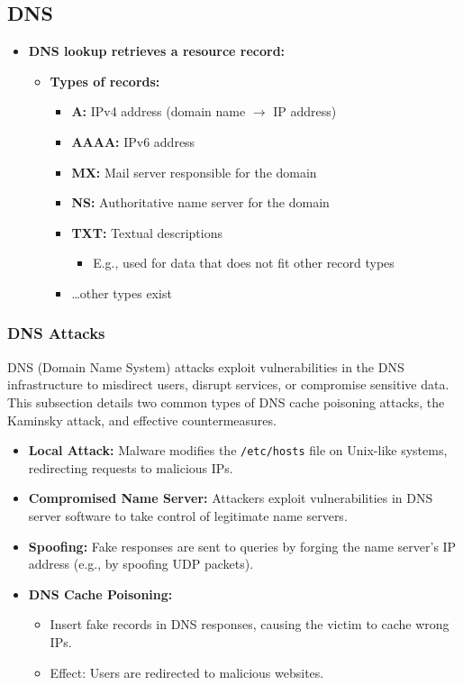 \subsection{DNS}
\begin{itemize}
    \item \textbf{DNS lookup retrieves a resource record:}
    \begin{itemize}
        \item \textbf{Types of records:}
        \begin{itemize}
            \item \textbf{A:} IPv4 address (domain name $\rightarrow$ IP address)
            \item \textbf{AAAA:} IPv6 address
            \item \textbf{MX:} Mail server responsible for the domain
            \item \textbf{NS:} Authoritative name server for the domain
            \item \textbf{TXT:} Textual descriptions
            \begin{itemize}
                \item E.g., used for data that does not fit other record types
            \end{itemize}
            \item \dots other types exist
        \end{itemize}
    \end{itemize}
\end{itemize}

\subsubsection{DNS Attacks}

DNS (Domain Name System) attacks exploit vulnerabilities in the DNS infrastructure to misdirect users, disrupt services, or compromise sensitive data. This subsection details two common types of DNS cache poisoning attacks, the Kaminsky attack, and effective countermeasures.

\begin{itemize}
    \item \textbf{Local Attack:} Malware modifies the \texttt{/etc/hosts} file on Unix-like systems, redirecting requests to malicious IPs.
    \item \textbf{Compromised Name Server:} Attackers exploit vulnerabilities in DNS server software to take control of legitimate name servers.
    \item \textbf{Spoofing:} Fake responses are sent to queries by forging the name server's IP address (e.g., by spoofing UDP packets).
    \item \textbf{DNS Cache Poisoning:}
    \begin{itemize}
        \item Insert fake records in DNS responses, causing the victim to cache wrong IPs.
        \item Effect: Users are redirected to malicious websites.
    \end{itemize}
\end{itemize}

